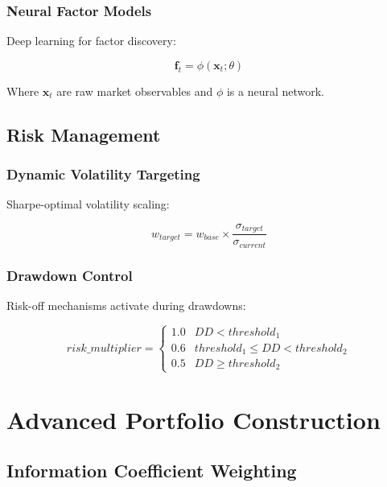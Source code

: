 \documentclass[11pt,letterpaper]{book}
\begin{document}
\subsection{Neural Factor Models}

Deep learning for factor discovery:

\begin{equation}
\mathbf{f}_t = \phi(\mathbf{x}_t; \theta)
\end{equation}

Where $\mathbf{x}_t$ are raw market observables and $\phi$ is a neural network.

\section{Risk Management}

\subsection{Dynamic Volatility Targeting}

Sharpe-optimal volatility scaling:

\begin{equation}
w_{target} = w_{base} \times \frac{\sigma_{target}}{\sigma_{current}}
\end{equation}

\subsection{Drawdown Control}

Risk-off mechanisms activate during drawdowns:

\begin{equation}
risk\_multiplier = \begin{cases}
    1.0 & DD < threshold_1 \\
    0.6 & threshold_1 \leq DD < threshold_2 \\
    0.5 & DD \geq threshold_2
\end{cases}
\end{equation}

\chapter{Advanced Portfolio Construction}

\section{Information Coefficient Weighting}
\end{document}
